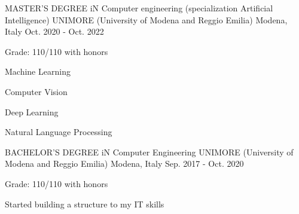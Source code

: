   \cventry
    {MASTER’S DEGREE iN Computer engineering (specialization Artificial Intelligence)} %
    {UNIMORE (University of Modena and Reggio Emilia)} %
    {Modena, Italy} %
    {Oct. 2020 - Oct. 2022} %
    {
    \begin{cvitems}%
        \item {Grade: 110/110 with honors}
        \item {Machine Learning}
        \item {Computer Vision}
        \item {Deep Learning}
        \item {Natural Language Processing}
      \end{cvitems}
      }
  \cventry
    {BACHELOR’S DEGREE iN Computer Engineering} %
    {UNIMORE (University of Modena and Reggio Emilia)} %
    {Modena, Italy} %
    {Sep. 2017 - Oct. 2020} %
    {
      \begin{cvitems} %
      \item {Grade: 110/110 with honors}
        \item {Started building a structure to my IT skills}
      \end{cvitems}
    }

